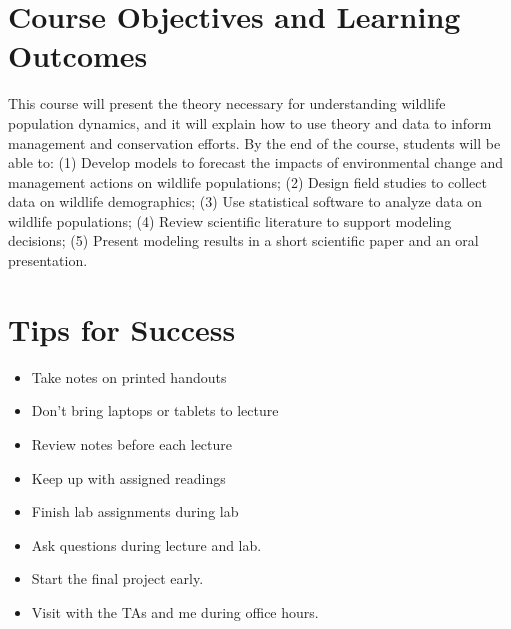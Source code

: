 \documentclass[12pt]{article}
\begin{document}
\vspace{-3mm}
\section*{\normalsize Course Objectives and Learning Outcomes}
\vspace{-4mm}
This course will present the theory necessary for understanding
wildlife population dynamics, and it will explain how to use theory
and data to inform management and conservation efforts. By the end of 
the course, students will be able to: (1) Develop models to forecast
the impacts of environmental change and management actions on wildlife
populations; (2) Design field studies to collect data on wildlife
demographics; (3) Use statistical software to analyze data on wildlife
populations; (4) Review scientific literature to support modeling
decisions; (5) Present modeling results in a short scientific paper
and an oral presentation. 

\vspace{-3mm}
\section*{\normalsize Tips for Success}
\vspace{-4mm}
\begin{itemize}
  \small
  \setlength{\itemsep}{0pt}
  \setlength{\parskip}{0pt}  %
  \item Take notes on printed handouts
  \item Don't bring laptops or tablets to lecture
  \item Review notes before each lecture
  \item Keep up with assigned readings
  \item Finish lab assignments during lab
  \item Ask questions during lecture and lab.
  \item Start the final project early.
  \item Visit with the TAs and me during office hours.
\end{itemize}


\vspace{-3mm}
\end{document}
